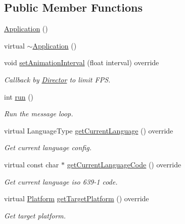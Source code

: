 \subsection*{Public Member Functions}
\begin{DoxyCompactItemize}
\item 
\hyperlink{classApplication_afa8cc05ce6b6092be5ecdfdae44e05f8}{Application} ()
\item 
virtual \hyperlink{classApplication_a748bca84fefb9c12661cfaa2f623748d}{$\sim$\+Application} ()
\item 
void \hyperlink{classApplication_a760516339314580f5086173d006483cc}{set\+Animation\+Interval} (float interval) override
\begin{DoxyCompactList}\small\item\em Callback by \hyperlink{classDirector}{Director} to limit F\+PS. \end{DoxyCompactList}\item 
\mbox{\label{classApplication_a8cf8941c8db90117d3735bce5ae1fdf4}} 
int \hyperlink{classApplication_a8cf8941c8db90117d3735bce5ae1fdf4}{run} ()
\begin{DoxyCompactList}\small\item\em Run the message loop. \end{DoxyCompactList}\item 
virtual Language\+Type \hyperlink{classApplication_a78d257080c2dc2ff625bb4b5835667df}{get\+Current\+Language} () override
\begin{DoxyCompactList}\small\item\em Get current language config. \end{DoxyCompactList}\item 
virtual const char $\ast$ \hyperlink{classApplication_a8b381edef7fa6ce48092073c6d843c4b}{get\+Current\+Language\+Code} () override
\begin{DoxyCompactList}\small\item\em Get current language iso 639-\/1 code. \end{DoxyCompactList}\item 
\mbox{\label{classApplication_ac5c4c74f8816b5a9b19ccfd72d3663c5}} 
virtual \hyperlink{classApplicationProtocol_aff3819b9b879107dc9c207d0e7ae36d1}{Platform} \hyperlink{classApplication_ac5c4c74f8816b5a9b19ccfd72d3663c5}{get\+Target\+Platform} () override
\begin{DoxyCompactList}\small\item\em Get target platform. \end{DoxyCompactList}\item 

\end{DoxyCompactItemize}

